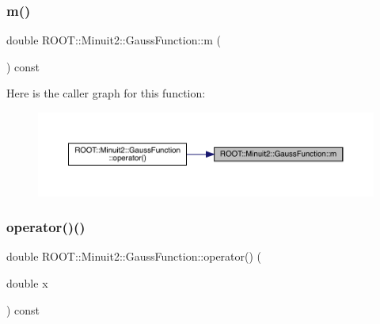 \mbox{\label{classROOT_1_1Minuit2_1_1GaussFunction_a746dc27d10faf57599e9a0a5bc232a1d}} 
\subsubsection{\texorpdfstring{m()}{m()}\hspace{0.1cm}{\footnotesize\ttfamily [2/2]}}
{\footnotesize\ttfamily double R\+O\+O\+T\+::\+Minuit2\+::\+Gauss\+Function\+::m (\begin{DoxyParamCaption}{ }\end{DoxyParamCaption}) const\hspace{0.3cm}{\ttfamily [inline]}}

Here is the caller graph for this function\+:
\nopagebreak
\begin{figure}[H]
\begin{center}
\leavevmode
\includegraphics[width=350pt]{d7/d62/classROOT_1_1Minuit2_1_1GaussFunction_a746dc27d10faf57599e9a0a5bc232a1d_icgraph}
\end{center}
\end{figure}
\mbox{\label{classROOT_1_1Minuit2_1_1GaussFunction_a5fe07f3350b17d79583af7b844ded399}} 
\subsubsection{\texorpdfstring{operator()()}{operator()()}\hspace{0.1cm}{\footnotesize\ttfamily [1/2]}}
{\footnotesize\ttfamily double R\+O\+O\+T\+::\+Minuit2\+::\+Gauss\+Function\+::operator() (\begin{DoxyParamCaption}\item[{double}]{x }\end{DoxyParamCaption}) const\hspace{0.3cm}{\ttfamily [inline]}}

